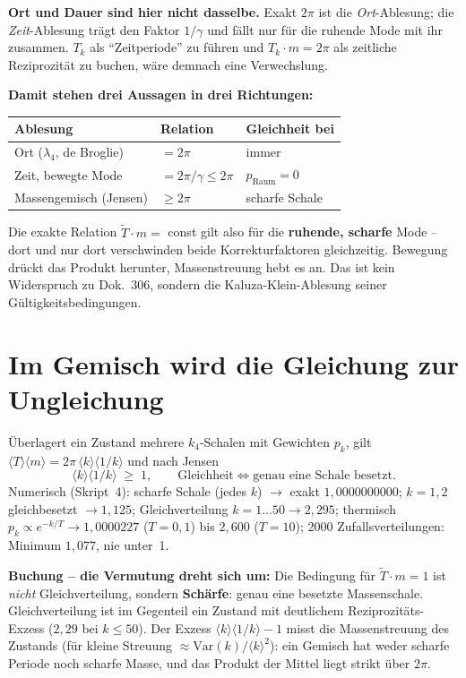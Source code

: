 \documentclass[11pt]{report}
\begin{document}
\textbf{Ort und Dauer sind hier nicht dasselbe.} Exakt $2\pi$ ist
die \emph{Ort}-Ablesung; die \emph{Zeit}-Ablesung trägt den Faktor
$1/\gamma$ und fällt nur für die ruhende Mode mit ihr zusammen.
$T_k$ als \enquote{Zeitperiode} zu führen und
$T_k\cdot m = 2\pi$ als zeitliche Reziprozität zu buchen, wäre
demnach eine Verwechslung.

\textbf{Damit stehen drei Aussagen in drei Richtungen:}
\begin{center}
\begin{tabular}{lll}
\toprule
Ablesung & Relation & Gleichheit bei \\
\midrule
Ort ($\lambda_4$, de Broglie) & $=2\pi$ & immer \\
Zeit, bewegte Mode & $=2\pi/\gamma \le 2\pi$ &
  $p_\text{Raum} = 0$ \\
Massengemisch (Jensen) & $\ge 2\pi$ & scharfe Schale \\
\bottomrule
\end{tabular}
\end{center}

\noindent Die exakte Relation $\tilde T\cdot m = $ const gilt also
für die \textbf{ruhende, scharfe} Mode -- dort und nur dort
verschwinden beide Korrekturfaktoren gleichzeitig. Bewegung
drückt das Produkt herunter, Massenstreuung hebt es an. Das ist
kein Widerspruch zu Dok.~306, sondern die Kaluza-Klein-Ablesung
seiner Gültigkeitsbedingungen.

\section{Im Gemisch wird die Gleichung zur Ungleichung}

Überlagert ein Zustand mehrere $k_4$-Schalen mit Gewichten $p_k$,
gilt $\langle T\rangle\langle m\rangle =
2\pi\,\langle k\rangle\langle 1/k\rangle$ und nach Jensen
\begin{equation}
  \langle k\rangle\langle 1/k\rangle \;\ge\; 1,
  \qquad\text{Gleichheit} \iff \text{genau eine Schale besetzt.}
\end{equation}
Numerisch (Skript~4): scharfe Schale (jedes $k$) $\to$ exakt
$1{,}0000000000$; $k = 1,2$ gleichbesetzt $\to 1{,}125$;
Gleichverteilung $k = 1\ldots50 \to 2{,}295$; thermisch
$p_k \propto e^{-k/T} \to 1{,}0000227$ ($T = 0{,}1$) bis
$2{,}600$ ($T = 10$); 2000 Zufallsverteilungen: Minimum
$1{,}077$, nie unter~1.

\textbf{Buchung -- die Vermutung dreht sich um:} Die Bedingung
für $\tilde T\cdot m = 1$ ist \emph{nicht} Gleichverteilung,
sondern \textbf{Schärfe}: genau eine besetzte Massenschale.
Gleichverteilung ist im Gegenteil ein Zustand mit deutlichem
Reziprozitäts-Exzess ($2{,}29$ bei $k \le 50$). Der Exzess
$\langle k\rangle\langle 1/k\rangle - 1$ misst die Massenstreuung
des Zustands (für kleine Streuung
$\approx \mathrm{Var}(k)/\langle k\rangle^2$): ein Gemisch hat
weder scharfe Periode noch scharfe Masse, und das Produkt der
Mittel liegt strikt über $2\pi$.
\end{document}
